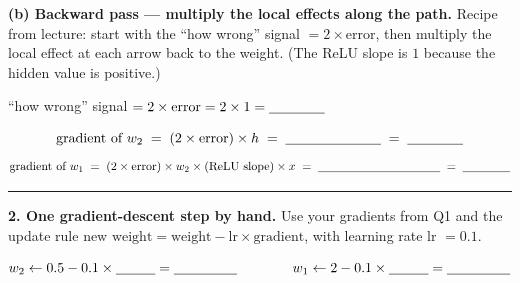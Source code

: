 \documentclass[11pt]{article}
\newif\ifsolution
\newcommand{\blk}[1]{\underline{\hspace{#1}}}
\newcommand{\rb}[2]{\ifsolution\textbf{#1}\else\blk{#2}\fi}
\newcommand{\keybox}[1]{\ifsolution\par\vspace{2pt}%
  \fbox{\parbox{0.965\textwidth}{\small\textbf{Answer.}\; #1}}\par\fi}
\newcommand{\work}[1]{\ifsolution\else\vspace{#1}\fi}
\begin{document}
\work{0.4cm}

\keybox{$h=\operatorname{ReLU}(2)=2$; \ $\hat y = 0.5\times 2 = 1$; \ error $=1-0=1$; \
loss $=1^2 = 1$. The guess overshot the target of $0$.}

\vspace{4pt}
\textbf{(b) Backward pass --- multiply the local effects along the path.}\;
{\small Recipe from lecture: start with the ``how wrong'' signal $=2\times\text{error}$, then
multiply the local effect at each arrow back to the weight. (The ReLU slope is $1$ because the
hidden value is positive.)}

\vspace{3pt}
``how wrong'' signal $= 2 \times \text{error} = 2 \times 1 = \rb{$2$}{1.4cm}$

\[
\text{gradient of } w_2 \;=\; (2\times\text{error}) \times h
\;=\; \blk{2.4cm} \;=\; \rb{$4$}{1.4cm}
\]
\[
\text{gradient of } w_1 \;=\; (2\times\text{error}) \times w_2 \times (\text{ReLU slope}) \times x
\;=\; \blk{3.6cm} \;=\; \rb{$1$}{1.4cm}
\]

\work{0.6cm}

\keybox{The shared ``how wrong'' signal is $2\times\text{error}=2\times 1 = 2$.\\
gradient of $w_2 = 2 \times h = 2 \times 2 = \mathbf{4}$ \ (short path: only the last weight).\\
gradient of $w_1 = 2 \times w_2 \times 1 \times x = 2 \times 0.5 \times 1 \times 1 = \mathbf{1}$
\ (longer path: back through $w_2$ and the ReLU). Both gradients are positive, so both weights
should decrease.}

\vspace{2pt}\hrule\vspace{5pt}

\textbf{2. One gradient-descent step by hand.}\; {\small Use your gradients from Q1 and the
update rule} $\text{new weight} = \text{weight} - \text{lr}\times\text{gradient}$, {\small with
learning rate lr $=0.1$.}

\[
w_2 \leftarrow 0.5 - 0.1 \times \rb{$4$}{1cm} = \rb{$0.1$}{1.6cm}
\qquad\qquad
w_1 \leftarrow 2 - 0.1 \times \rb{$1$}{1cm} = \rb{$1.9$}{1.6cm}
\]

\work{0.7cm}

\keybox{$w_2 \leftarrow 0.5 - 0.1\times 4 = 0.5 - 0.4 = \mathbf{0.1}$; \quad
$w_1 \leftarrow 2 - 0.1\times 1 = 2 - 0.1 = \mathbf{1.9}$. Both came down, as expected --- the
guess was too high. (Re-running the forward pass with the new weights gives loss $\approx 0.04$,
down from $1$: one step already helped.)}
\end{document}
